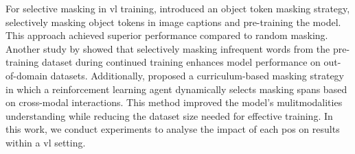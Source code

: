 For selective masking in \acrshort{vl} training,  introduced an object token masking strategy, selectively masking object tokens in image captions and pre-training the model. 
This approach achieved superior performance compared to random masking. 
Another study by  showed that selectively masking infrequent words from the pre-training dataset during continued training enhances model performance on out-of-domain datasets. 
Additionally, \cite{rf-curriculum-masking} proposed a curriculum-based masking strategy in which a reinforcement learning agent dynamically selects masking spans based on cross-modal interactions. 
This method improved the model’s mulitmodalities understanding while reducing the dataset size needed for effective training. 
In this work, we conduct experiments to analyse the impact of each \acrshort{pos} on results within a \acrshort{vl} setting.





